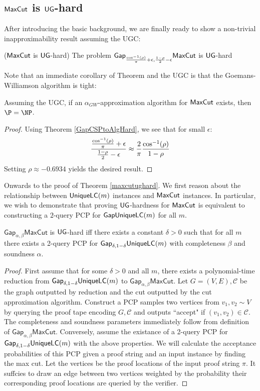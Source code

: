 \subsection{$\mathsf{MaxCut}$ is $\mathsf{UG}$-hard}
After introducing the basic background, we are finally ready to show a non-trivial inapproximability result assuming the UGC:

\begin{theorem} \label{maxcutughard} ($\mathsf{MaxCut}$ is $\mathsf{UG}$-hard) The problem $\mathsf{Gap}_{\frac{\cos^{-1}(\rho)}{\pi} + \epsilon, \frac{1-\rho}{2} - \epsilon}\mathsf{MaxCut}$ is $\mathsf{UG}$-hard
\end{theorem}
Note that an immediate corollary of Theorem and the UGC is that the Goemans-Williamson algorithm is tight:

\begin{corollary}
Assuming the UGC, if an $\alpha_{GW}$-approximation algorithm for $\mathsf{MaxCut}$ exists, then $\P = \NP$.
\end{corollary}
%
\begin{proof}
Using Theorem \ref{GapCSPtoAlgHard}, we see that for small $\epsilon$:
\[ \frac{\frac{\cos^{-1}(\rho)}{\pi} + \epsilon}{\frac{1-\rho}{2} - \epsilon} \approx \frac{2}{\pi}\frac{\cos^{-1}(\rho)}{1 - \rho} \]
Setting $\rho \approx -0.6934$ yields the desired result.
\end{proof}

Onwards to the proof of Theorem \ref{maxcutughard}. We first reason about the relationship between $\mathsf{UniqueLC}(m)$ instances and $\mathsf{MaxCut}$ instances. In particular, we wish to demonstrate that proving $\mathsf{UG}$-hardness for $\mathsf{MaxCut}$ is equivalent to constructing a $2$-query PCP for $\mathsf{GapUniqueLC}(m)$ for all $m$.

\begin{theorem}
  $\mathsf{Gap}_{\alpha,\beta}\mathsf{MaxCut}$ is $\mathsf{UG}$-hard iff there exists a constant $\delta > 0$ such that for all $m$ there exists a 2-query PCP for $\mathsf{Gap}_{\delta, 1-\delta}\mathsf{UniqueLC}(m)$ with completeness $\beta$ and soundness $\alpha$.
\end{theorem}
%
\begin{proof}
  First assume that for some $\delta > 0$ and all $m$, there exists a polynomial-time reduction from $\mathsf{Gap}_{\delta, 1-\delta}\mathsf{UniqueLC}(m)$ to $\mathsf{Gap}_{\alpha,\beta}\mathsf{MaxCut}$. Let $G=(V,E), \mathcal{C}$ be the graph outputted by reduction and the cut outputted by the cut approximation algorithm. Construct a PCP samples two vertices from $v_1, v_2 \sim V$ by querying the proof tape encoding $G,\mathcal{C}$ and outputs ``accept" if $(v_1,v_2) \in \mathcal{C}$. The completeness and soundness parameters immediately follow from definition of $\mathsf{Gap}_{\alpha,\beta}\mathsf{MaxCut}$. Conversely, assume the existance of a 2-query PCP for $\mathsf{Gap}_{\delta, 1-\delta}\mathsf{UniqueLC}(m)$ with the above properties. We will calculate the acceptance probabilities of this PCP given a proof string and an input instance by finding the max cut. Let the vertices be the proof locations of the input proof string $\pi$. It suffcies to draw an edge between two vertices weighted by the probability their corresponding proof locations are queried by the verifier.
\end{proof}

